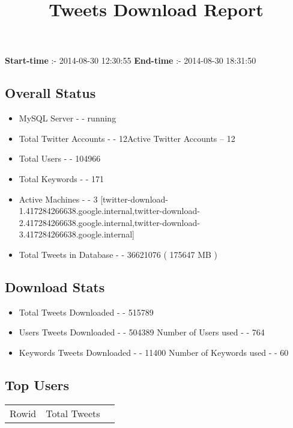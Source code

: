 \documentclass{article}\usepackage[T1]{fontenc}
\begin{document}
\title{\textbf{Tweets Download Report}}
               \date{}
                \maketitle
               \centerline{\textbf{Start-time} :- 2014-08-30 12:30:55 \hspace{40pt} \textbf{End-time} :- 2014-08-30 18:31:50}               \subsection*{Overall Status}                \begin{itemize}                \item MySQL Server - - running               \item Total Twitter Accounts - - 12\newline Active Twitter Accounts -- 12               \item Total Users - - 104966               \item Total Keywords - - 171               \item Active Machines - - 3 [twitter-download-1.417284266638.google.internal,twitter-download-2.417284266638.google.internal,twitter-download-3.417284266638.google.internal]               \item Total Tweets in Database - - 36621076 ( 175647 MB )               \end{itemize}               \subsection*{Download Stats}                \begin{itemize}                \item Total Tweets Downloaded - - 515789               \item Users Tweets Downloaded - - 504389 \newline Number of Users used - - 764               \item Keywords Tweets Downloaded - - 11400 \newline Number of Keywords used - - 60              \end{itemize}              \subsection*{Top Users}\begin{tabular}{|c|c|c|}         \hline         Rowid & Total Tweets \\ 

\end{tabular}
\end{document}
